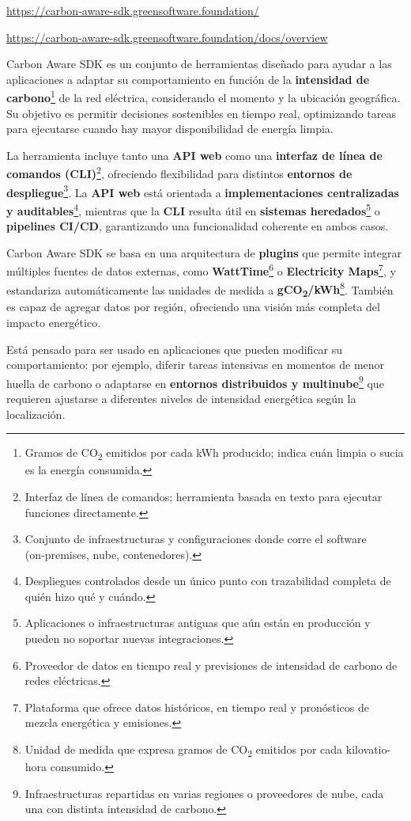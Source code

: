 \documentclass[12pt,a4paper]{report}
\begin{document}
\href{https://carbon-aware-sdk.greensoftware.foundation/}{https://carbon-aware-sdk.greensoftware.foundation/}

\href{https://carbon-aware-sdk.greensoftware.foundation/docs/overview}{https://carbon-aware-sdk.greensoftware.foundation/docs/overview}

Carbon Aware SDK es un conjunto de herramientas diseñado para ayudar a las
aplicaciones a adaptar su comportamiento en función de la \textbf{intensidad de
  carbono}\footnote{Gramos de CO\textsubscript{2} emitidos por cada kWh
  producido; indica cuán limpia o sucia es la energía consumida.} de la red
eléctrica, considerando el momento y la ubicación geográfica. Su objetivo es
permitir decisiones sostenibles en tiempo real, optimizando tareas para
ejecutarse cuando hay mayor disponibilidad de energía limpia.

La herramienta incluye tanto una \textbf{API web} como una \textbf{interfaz de línea de comandos
  (CLI)}\footnote{Interfaz de línea de comandos; herramienta basada en texto para
  ejecutar funciones directamente.}, ofreciendo flexibilidad para distintos
\textbf{entornos de despliegue}\footnote{Conjunto de infraestructuras y
  configuraciones donde corre el software (on‑premises, nube, contenedores).}. La
\textbf{API web} está orientada a
\textbf{implementaciones centralizadas y auditables}\footnote{Despliegues
  controlados desde un único punto con trazabilidad completa de quién hizo qué y
  cuándo.}, mientras que la \textbf{CLI} resulta útil
en \textbf{sistemas heredados}\footnote{Aplicaciones o infraestructuras
  antiguas que aún están en producción y pueden no soportar nuevas
  integraciones.} o \textbf{pipelines CI/CD}, garantizando una funcionalidad coherente en ambos casos.

Carbon Aware SDK se basa en una arquitectura de
\textbf{plugins} que permite integrar múltiples fuentes
de datos externas, como \textbf{WattTime}\footnote{Proveedor de datos en tiempo
  real y previsiones de intensidad de carbono de redes eléctricas.} o
\textbf{Electricity Maps}\footnote{Plataforma que ofrece datos históricos, en
  tiempo real y pronósticos de mezcla energética y emisiones.}, y estandariza
automáticamente las unidades de medida a
\textbf{gCO\textsubscript{2}/kWh}\footnote{Unidad de medida que expresa gramos
  de CO\textsubscript{2} emitidos por cada kilovatio-hora consumido.}. También es
capaz de agregar datos por región, ofreciendo una visión más completa del
impacto energético.

Está pensado para ser usado en aplicaciones que pueden modificar su
comportamiento: por ejemplo, diferir tareas intensivas en momentos de menor
huella de carbono o adaptarse en \textbf{entornos distribuidos y
  multinube}\footnote{Infraestructuras repartidas en varias regiones o
  proveedores de nube, cada una con distinta intensidad de carbono.} que
requieren ajustarse a diferentes niveles de intensidad energética según la
localización.
\end{document}
